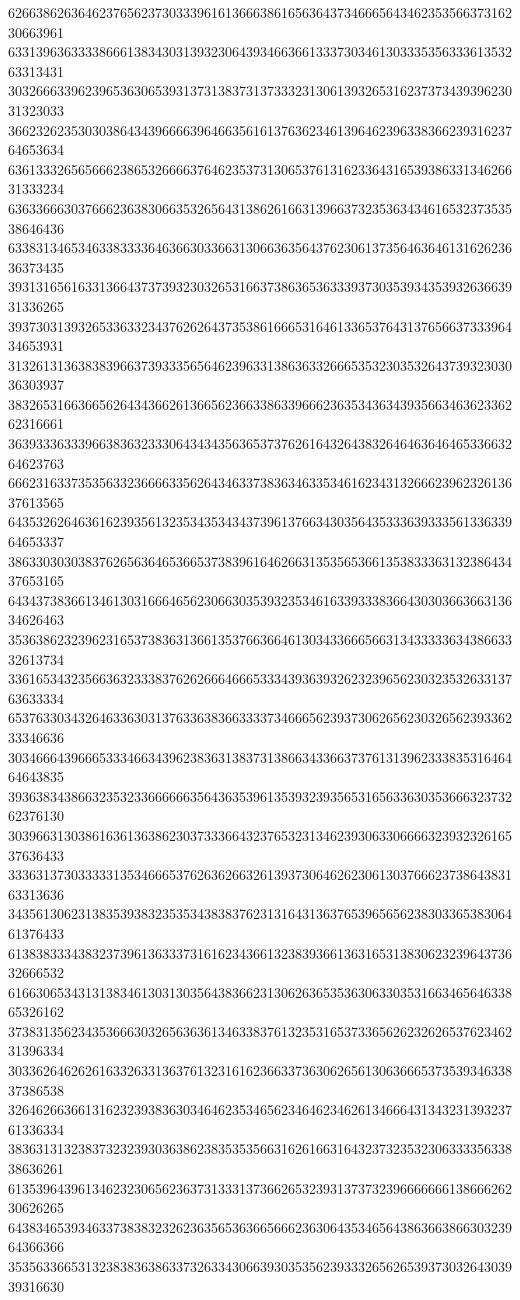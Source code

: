 62663862636462376562373033396161366638616563643734666564346235356637316230663961
63313963633338666138343031393230643934663661333730346130333535633361353263313431
30326663396239653630653931373138373137333231306139326531623737343939623031323033
36623262353030386434396666396466356161376362346139646239633836623931623764653634
63613332656566623865326666376462353731306537613162336431653938633134626631333234
63633666303766623638306635326564313862616631396637323536343461653237353538646436
63383134653463383333646366303366313066363564376230613735646364613162623636373435
39313165616331366437373932303265316637386365363339373035393435393263663931336265
39373031393265336332343762626437353861666531646133653764313765663733396434653931
31326131363838396637393335656462396331386363326665353230353264373932303036303937
38326531663665626434366261366562366338633966623635343634393566346362336262316661
36393336333966383632333064343435636537376261643264383264646364646533663264623763
66623163373535633236666335626434633738363463353461623431326662396232613637613565
64353262646361623935613235343534343739613766343035643533363933356133633964653337
38633030303837626563646536653738396164626631353565366135383336313238643437653165
64343738366134613031666465623066303539323534616339333836643030366366313634626463
35363862323962316537383631366135376636646130343366656631343333363438663332613734
33616534323566363233383762626664666533343936393262323965623032353263313763633334
65376330343264633630313763363836633337346665623937306265623032656239336233346636
30346664396665333466343962383631383731386634336637376131396233383531646464643835
39363834386632353233666666356436353961353932393565316563363035366632373262376130
30396631303861636136386230373336643237653231346239306330666632393232616537636433
33363137303333313534666537626362663261393730646262306130376662373864383163313636
34356130623138353938323535343838376231316431363765396565623830336538306461376433
61383833343832373961363337316162343661323839366136316531383062323964373632666532
61663065343131383461303130356438366231306263653536306330353166346564633865326162
37383135623435366630326563636134633837613235316537336562623262653762346231396334
30336264626261633263313637613231616236633736306265613063666537353934633837386538
32646266366131623239383630346462353465623464623462613466643134323139323761336334
38363131323837323239303638623835353566316261663164323732353230633335633838636261
61353964396134623230656236373133313736626532393137373239666666613866626230626265
64383465393463373838323262363565363665666236306435346564386366386630323964366366
35356336653132383836386337326334306639303535623933326562653937303264303939316630
